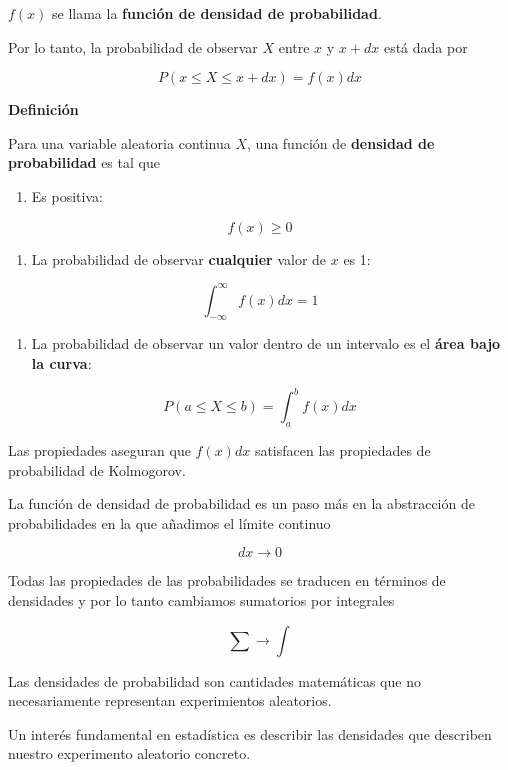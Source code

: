 \documentclass[
]{book}
\providecommand{\tightlist}{%
  \setlength{\itemsep}{0pt}\setlength{\parskip}{0pt}}
\begin{document}
\(f(x)\) se llama la \textbf{función de densidad de probabilidad}.

Por lo tanto, la probabilidad de observar \(X\) entre \(x\) y \(x+dx\)
está dada por

\[P( x\leq X \leq x+dx )= f(x) dx\]

\textbf{Definición}

Para una variable aleatoria continua \(X\), una función de \textbf{densidad de probabilidad} es tal que

\begin{enumerate}
\def\labelenumi{\arabic{enumi})}
\tightlist
\item
  Es positiva:
\end{enumerate}

\[f(x) \geq 0\]

\begin{enumerate}
\def\labelenumi{\arabic{enumi})}
\setcounter{enumi}{1}
\tightlist
\item
  La probabilidad de observar \textbf{cualquier} valor de \(x\) es 1:
\end{enumerate}

\[\int_{-\infty}^{\infty} f(x) dx = 1\]

\begin{enumerate}
\def\labelenumi{\arabic{enumi})}
\setcounter{enumi}{2}
\tightlist
\item
  La probabilidad de observar un valor dentro de un intervalo es el \textbf{área bajo la curva}:
\end{enumerate}

\[ P( a\leq X \leq b)=\int_{a}^{b} f(x) dx\]

Las propiedades aseguran que \(f(x)dx\) satisfacen las propiedades de probabilidad de Kolmogorov.

La función de densidad de probabilidad es un paso más en la abstracción de probabilidades en la que añadimos el límite continuo

\[dx \rightarrow 0\]

Todas las propiedades de las probabilidades se traducen en términos de densidades y por lo tanto cambiamos sumatorios por integrales

\[\sum \rightarrow \int\]

Las densidades de probabilidad son cantidades matemáticas que no necesariamente representan experimientos aleatorios.

Un interés fundamental en estadística es describir las densidades que describen nuestro experimento aleatorio concreto.
\end{document}
